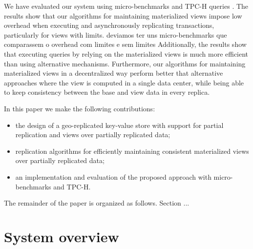 \documentclass{vldb}
\newcommand{\grumbler}[2]{{\color{red}{\bf #1:} #2}}
\newcommand{\nuno}[1]{\grumbler{nuno}{#1}}
\newcommand{\outline}[1]{}
\begin{document}
We have evaluated our system using micro-benchmarks and TPC-H queries \cite{}.
The results show that our algorithms for maintaining materialized views impose 
low overhead when executing and asynchronously replicating transactions, particularly
for views with limits.
\nuno{deviamos ter uns micro-benchmarks que comparassem o overhead com limites e sem limites}
Additionally, the results show that executing queries by relying on the materialized views is much more 
efficient than using alternative mechanisms.  
Furthermore, our algorithms for maintaining materialized views in a decentralized way perform better 
that alternative approaches where the view is computed in a single data center, while being
able to  keep consistency between the base and view data in every replica.

In this paper we make the following contributions:
\begin{itemize}
	\item the design of a geo-replicated key-value store  with support for partial replication
	and views over partially replicated data; 
	\item replication algorithms for efficiently maintaining consistent materialized views over 
	partially replicated data;
	 \item an implementation and evaluation of the proposed approach with micro-benchmarks
	 and TPC-H.
\end{itemize}

The remainder of the paper is organized as follows. Section ...

\outline{topicos

\begin{itemize}
	\item Num. DC a aumentar
	\item Replicar totalmente tem problemas
	\item Replicação parcial
	\item Queries sobre dados replicados parcialmente
	\begin{itemize}
		\item Standard solution?
	\end{itemize}
	\item Views materializadas replicadas totalmente
	\item Contribuições
\end{itemize}
}

\section{System overview}
\end{document}
